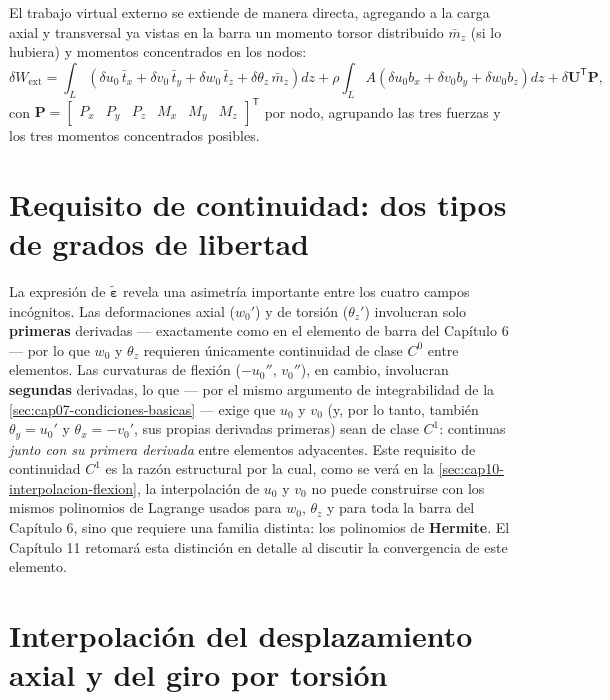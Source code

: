 El trabajo virtual externo se extiende de manera directa, agregando a la carga axial y transversal ya vistas en la barra un momento torsor distribuido $\bar m_z$ (si lo hubiera) y momentos concentrados en los nodos:
\[
\delta W_{\text{ext}} = \int_L \left(\delta u_0\,\bar t_x + \delta v_0\,\bar t_y + \delta w_0\,\bar t_z + \delta\theta_z\,\bar m_z\right) dz + \rho\!\int_L\! A\left(\delta u_0 b_x+\delta v_0 b_y+\delta w_0 b_z\right)dz + \delta\bm U^{\mathsf T}\bm P ,
\]
con $\bm P=\begin{bmatrix}P_x&P_y&P_z&M_x&M_y&M_z\end{bmatrix}^{\mathsf T}$ por nodo, agrupando las tres fuerzas y los tres momentos concentrados posibles.

\section{Requisito de continuidad: dos tipos de grados de libertad}
\label{sec:cap10-continuidad-mixta}

\begin{observacion}
La expresión de $\tilde{\bm\varepsilon}$ revela una asimetría importante entre los cuatro campos incógnitos. Las deformaciones axial ($w_0'$) y de torsión ($\theta_z'$) involucran solo \textbf{primeras} derivadas --- exactamente como en el elemento de barra del Capítulo 6 --- por lo que $w_0$ y $\theta_z$ requieren únicamente continuidad de clase $C^0$ entre elementos. Las curvaturas de flexión ($-u_0''$, $v_0''$), en cambio, involucran \textbf{segundas} derivadas, lo que --- por el mismo argumento de integrabilidad de la \cref{sec:cap07-condiciones-basicas} --- exige que $u_0$ y $v_0$ (y, por lo tanto, también $\theta_y=u_0'$ y $\theta_x=-v_0'$, sus propias derivadas primeras) sean de clase $C^1$: continuas \emph{junto con su primera derivada} entre elementos adyacentes. Este requisito de continuidad $C^1$ es la razón estructural por la cual, como se verá en la \cref{sec:cap10-interpolacion-flexion}, la interpolación de $u_0$ y $v_0$ no puede construirse con los mismos polinomios de Lagrange usados para $w_0$, $\theta_z$ y para toda la barra del Capítulo 6, sino que requiere una familia distinta: los polinomios de \textbf{Hermite}. El Capítulo 11 retomará esta distinción en detalle al discutir la convergencia de este elemento.
\end{observacion}

\section{Interpolación del desplazamiento axial y del giro por torsión}
\label{sec:cap10-interpolacion-c0}

